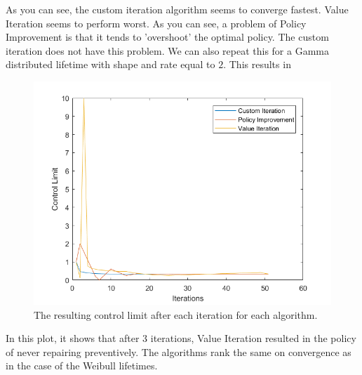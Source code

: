 As you can see, the custom iteration algorithm seems to converge fastest.
Value Iteration seems to perform worst.
As you can see, a problem of Policy Improvement is that it tends to 'overshoot' the optimal policy.
The custom iteration does not have this problem.
We can also repeat this for a Gamma distributed lifetime with shape and rate equal to $2$.
This results in  
\begin{figure}[H]
\centering
\includegraphics[width=\textwidth]{Plots/CL Gamma2-2 Discount-1 Start-1.png}
\caption{The resulting control limit after each iteration for each algorithm.}
\end{figure}
In this plot, it shows that after 3 iterations, Value Iteration resulted in the policy of never repairing preventively.
The algorithms rank the same on convergence as in the case of the Weibull lifetimes.

